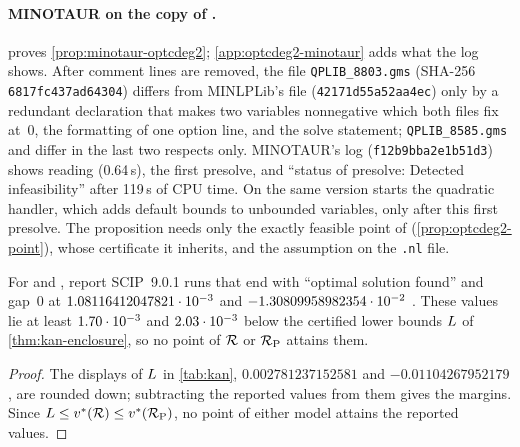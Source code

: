 \paragraph{MINOTAUR on the copy of .}
 proves \cref{prop:minotaur-optcdeg2}; \cref{app:optcdeg2-minotaur} adds what the log shows.
After comment lines are removed, the file \texttt{QPLIB\_8803.gms} (SHA-256 \texttt{6817fc437ad64304}) differs from MINLPLib's  file (\texttt{42171d55a52aa4ec}) only by a redundant declaration that makes two variables nonnegative which both files fix at~0, the formatting of one option line, and the solve statement; \texttt{QPLIB\_8585.gms} and  differ in the last two respects only.
MINOTAUR's log (\texttt{f12b9bba2e1b51d3}) shows reading (0.64\,s), the first presolve, and ``status of presolve: Detected infeasibility'' after 119\,s of CPU time.
On  the same version starts the quadratic handler, which adds default bounds to unbounded variables, only after this first presolve.
The proposition needs only the exactly feasible point of  (\cref{prop:optcdeg2-point}), whose certificate it inherits, and the assumption on the \texttt{.nl} file.

\begin{proposition}\label{prop:kan-scip}
For  and , \citet{karia2025-deterministic-global-optimization-over-trained} report SCIP~9.0.1 runs that end with ``optimal solution found'' and gap~0 at $1.08116412047821\cdot 10^{-3}$ and $-1.30809958982354\cdot 10^{-2}$ \citep{karia2025-karia-et-al-zenodo-default}.
These values lie at least $1.70\cdot 10^{-3}$ and $2.03\cdot 10^{-3}$ below the certified lower bounds $L$ of \cref{thm:kan-enclosure}, so no point of $\mathcal{R}$ or $\mathcal{R}_{\mathrm{P}}$ attains them.
\end{proposition}

\begin{proof}
The displays of $L$ in \cref{tab:kan}, $0.002781237152581$ and $-0.01104267952179$, are rounded down; subtracting the reported values from them gives the margins.
Since $L\le v^{*}(\mathcal{R})\le v^{*}(\mathcal{R}_{\mathrm{P}})$, no point of either model attains the reported values.
\end{proof}

